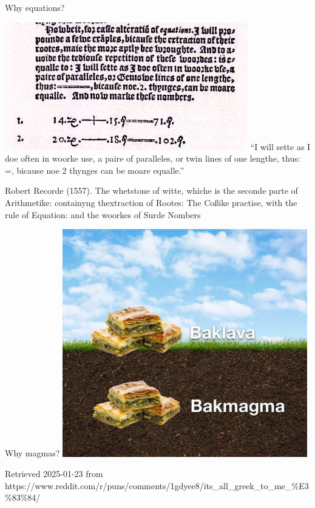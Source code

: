 \documentclass{beamer}
\begin{document}
\begin{frame}{Why equations?}

\includegraphics[width=\textwidth]{eq_sign.png}
``I will sette as I doe often in woorke use, a paire of paralleles, or twin lines of one lengthe, thus: =, bicause noe 2 thynges can be moare equalle.'' \bigskip

\tiny Robert Recorde (1557). The whetstone of witte, whiche is the seconde parte of Arithmetike: containyng thextraction of Rootes: The Coßike practise, with the rule of Equation: and the woorkes of Surde Nombers

\end{frame}


\begin{frame}{Why magmas?}
\includegraphics[width=0.8\textwidth]{baklava}

\tiny Retrieved 2025-01-23 from https://www.reddit.com/r/puns/comments/1gdyee8/its\_all\_greek\_to\_me\_\%E3\%83\%84/
\end{frame}
\end{document}
